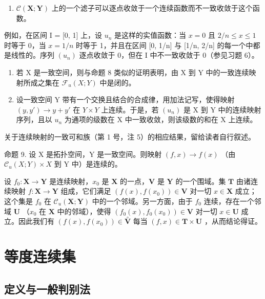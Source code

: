 \begin{enumerate}
\def\labelenumi{\arabic{enumi})}
\setcounter{enumi}{1}
\tightlist
\item
  \(\mathcal{C}(\mathbf{X};\mathbf{Y})\) 上的一个滤子可以逐点收敛于一个连续函数而不一致收敛于这个函数。
\end{enumerate}

例如，在区间 I = {[}0, 1{]} 上，设 \(u_n\) 是这样的实值函数：当 \(x = 0\) 且 \(2/n \leqslant x \leqslant 1\) 时等于 0，当 \(x = 1/n\) 时等于 1，并且在区间 {[}0, 1/n{]} 与 {[}1/n, 2/n{]} 的每一个中都是线性的。序列 \((u_n)\) 逐点收敛于 0，但在 I 中不一致收敛于 0（参见习题 6）。

\begin{enumerate}
\def\labelenumi{\arabic{enumi})}
\setcounter{enumi}{2}
\item
  若 X 是一致空间，则与命题 8 类似的证明表明，由 X 到 Y 中的一致连续映射所成之集在 \(\mathcal{F}_u(X;Y)\) 中是闭的。
\item
  设一致空间 Y 带有一个交换且结合的合成律，用加法记写，使得映射 \((y, y') \to y + y'\) 在 \(Y \times Y\) 上连续。于是，若 \((u_n)\) 是 X 到 Y 中的连续映射序列，且以 \(u_n\) 为通项的级数在 X 中一致收敛，则该级数的和在 X 上连续。
\end{enumerate}

关于连续映射的一致可和族（第 1 号，注 5）的相应结果，留给读者自行叙述。

命题 9. 设 X 是拓扑空间，Y 是一致空间。则映射 \((f, x) \to f(x)\) （由 \(\mathcal{C}_u(X; Y) \times X\) 到 Y 中）是连续的。

设 \(f_0: \mathbf{X} \to \mathbf{Y}\) 是连续映射，\(x_0\) 是 \(\mathbf{X}\) 的一点，\(\mathbf{V}\) 是 \(\mathbf{Y}\) 的一个围域。集 \(\mathbf{T}\) 由诸连续映射 \(f: \mathbf{X} \to \mathbf{Y}\) 组成，它们满足 \((f(x), f(x_0)) \in \mathbf{V}\) 对一切 \(x \in \mathbf{X}\) 成立；这个集是 \(f_0\) 在 \(\mathcal{C}_u(\mathbf{X}; \mathbf{Y})\) 中的一个邻域。另一方面，由于 \(f_0\) 连续，存在一个邻域 \(\mathbf{U}\) （\(x_0\) 在 \(\mathbf{X}\) 中的邻域），使得 \((f_0(x), f_0(x_0)) \in \mathbf{V}\) 对一切 \(x \in \mathbf{U}\) 成立。因此我们有 \((f(x), f(x_0)) \in \overset{\circ}{\mathbf{V}}\) 每当 \((f, x) \in \mathbf{T} \times \mathbf{U}\) ，从而结论得证。

\section{等度连续集}

\subsection{定义与一般判别法}

